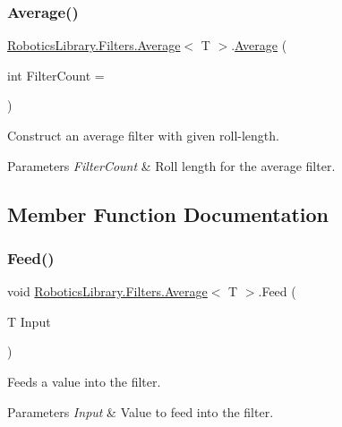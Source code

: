 \subsubsection{\texorpdfstring{Average()}{Average()}}
{\footnotesize\ttfamily \hyperlink{class_robotics_library_1_1_filters_1_1_average}{Robotics\+Library.\+Filters.\+Average}$<$ T $>$.\hyperlink{class_robotics_library_1_1_filters_1_1_average}{Average} (\begin{DoxyParamCaption}\item[{int}]{Filter\+Count = {} }\end{DoxyParamCaption})}



Construct an average filter with given roll-\/length. 


\begin{DoxyParams}{Parameters}
{\em Filter\+Count} & Roll length for the average filter.\\
\hline
\end{DoxyParams}


\subsection{Member Function Documentation}
\mbox{\label{class_robotics_library_1_1_filters_1_1_average_a27479a3706425bb721a7694acd388cdd}} 
\subsubsection{\texorpdfstring{Feed()}{Feed()}\hspace{0.1cm}{\footnotesize\ttfamily [1/2]}}
{\footnotesize\ttfamily void \hyperlink{class_robotics_library_1_1_filters_1_1_average}{Robotics\+Library.\+Filters.\+Average}$<$ T $>$.Feed (\begin{DoxyParamCaption}\item[{T}]{Input }\end{DoxyParamCaption})}



Feeds a value into the filter. 


\begin{DoxyParams}{Parameters}
{\em Input} & Value to feed into the filter.\\
\hline
\end{DoxyParams}


